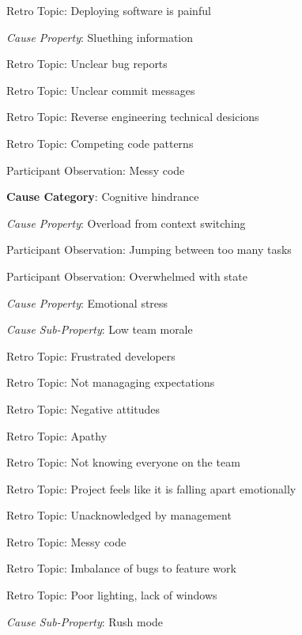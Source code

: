 \quad \quad \quad Retro Topic: Deploying software is painful

\quad \quad \textit{Cause Property}: Sluething information

\quad \quad \quad Retro Topic: Unclear bug reports

\quad \quad \quad Retro Topic: Unclear commit messages

\quad \quad \quad Retro Topic: Reverse engineering technical desicions

\quad \quad \quad Retro Topic: Competing code patterns

\quad \quad \quad Participant Observation: Messy code

\quad \textbf{Cause Category}: Cognitive hindrance

\quad \quad \textit{Cause Property}: Overload from context switching

\quad \quad \quad \quad Participant Observation: Jumping between too many tasks 

\quad \quad \quad \quad Participant Observation: Overwhelmed with state 

\quad \quad \textit{Cause Property}: Emotional stress

\quad \quad \quad \textit{Cause Sub-Property}: Low team morale

\quad \quad \quad \quad Retro Topic: Frustrated developers

\quad \quad \quad \quad Retro Topic: Not managaging expectations

\quad \quad \quad \quad Retro Topic: Negative attitudes

\quad \quad \quad \quad Retro Topic: Apathy

\quad \quad \quad \quad Retro Topic: Not knowing everyone on the team

\quad \quad \quad \quad Retro Topic: Project feels like it is falling apart emotionally

\quad \quad \quad \quad Retro Topic: Unacknowledged by management

\quad \quad \quad \quad Retro Topic: Messy code

\quad \quad \quad \quad Retro Topic: Imbalance of bugs to feature work

\quad \quad \quad \quad Retro Topic: Poor lighting, lack of windows

\quad \quad \quad \textit{Cause Sub-Property}: Rush mode

